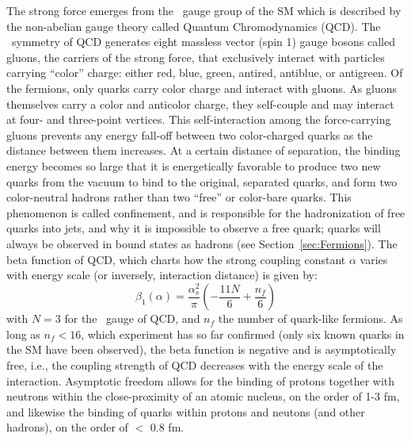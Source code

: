 The strong force emerges from the \SUthreeC~gauge group of the SM which is described by the non-abelian gauge theory called Quantum Chromodynamics (QCD). The \SUthreeC~symmetry of QCD generates eight massless vector (spin 1) gauge bosons called gluons, the carriers of the strong force, that exclusively interact with particles carrying ``color'' charge: either red, blue, green, antired, antiblue, or antigreen. Of the fermions, only quarks carry color charge and interact with gluons. As gluons themselves carry a color and anticolor charge, they self-couple and may interact at four- and three-point vertices. This self-interaction among the force-carrying gluons prevents any energy fall-off between two color-charged quarks as the distance between them increases. At a certain distance of separation, the binding energy becomes so large that it is energetically favorable to produce two new quarks from the vacuum to bind to the original, separated quarks, and form two color-neutral hadrons rather than two ``free'' or color-bare quarks. This phenomenon is called confinement, and is responsible for the hadronization of free quarks into jets, and why it is impossible to observe a free quark; quarks will always be observed in bound states as hadrons (see Section~\ref{sec:Fermions}).
The beta function of QCD, which charts how the strong coupling constant $\alpha$ varies with energy scale (or inversely, interaction distance) is given by:
\begin{equation}
    \beta_1(\alpha) = \frac{\alpha_s^2}{\pi}\left(-\frac{11N}{6}+\frac{n_f}{6}\right)
\end{equation}
with $N=3$ for the \SUthree~gauge of QCD, and $n_f$ the number of quark-like fermions. As long as $n_f<16$, which experiment has so far confirmed (only six known quarks in the SM have been observed), the beta function is negative and is asymptotically free, i.e., the coupling strength of QCD decreases with the energy scale of the interaction. Asymptotic freedom allows for the binding of protons together with neutrons within the close-proximity of an atomic nucleus, on the order of 1-3 fm, and likewise the binding of quarks within protons and neutons (and other hadrons), on the order of $<$ 0.8 fm. 